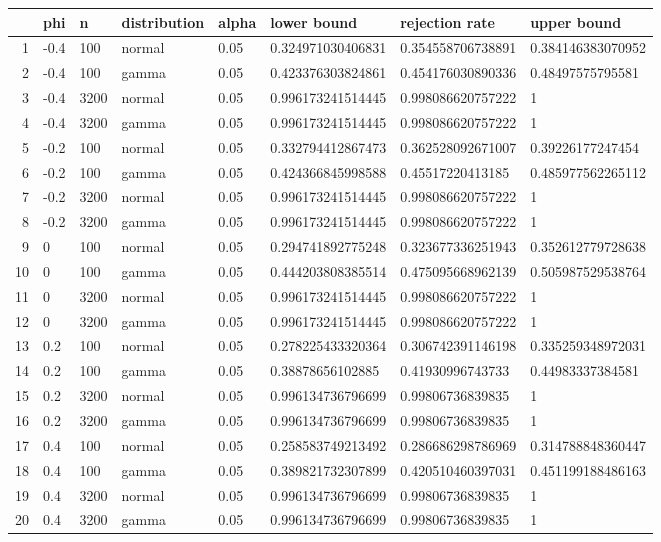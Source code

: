 \begin{table}[ht]
\centering
\begin{tabular}{rlllllll}
  \hline
 & phi & n & distribution & alpha & lower bound & rejection rate & upper bound \\ 
  \hline
1 & -0.4 & 100 & normal & 0.05 & 0.324971030406831 & 0.354558706738891 & 0.384146383070952 \\ 
  2 & -0.4 & 100 & gamma & 0.05 & 0.423376303824861 & 0.454176030890336 & 0.48497575795581 \\ 
  3 & -0.4 & 3200 & normal & 0.05 & 0.996173241514445 & 0.998086620757222 & 1 \\ 
  4 & -0.4 & 3200 & gamma & 0.05 & 0.996173241514445 & 0.998086620757222 & 1 \\ 
  5 & -0.2 & 100 & normal & 0.05 & 0.332794412867473 & 0.362528092671007 & 0.39226177247454 \\ 
  6 & -0.2 & 100 & gamma & 0.05 & 0.424366845998588 & 0.45517220413185 & 0.485977562265112 \\ 
  7 & -0.2 & 3200 & normal & 0.05 & 0.996173241514445 & 0.998086620757222 & 1 \\ 
  8 & -0.2 & 3200 & gamma & 0.05 & 0.996173241514445 & 0.998086620757222 & 1 \\ 
  9 & 0 & 100 & normal & 0.05 & 0.294741892775248 & 0.323677336251943 & 0.352612779728638 \\ 
  10 & 0 & 100 & gamma & 0.05 & 0.444203808385514 & 0.475095668962139 & 0.505987529538764 \\ 
  11 & 0 & 3200 & normal & 0.05 & 0.996173241514445 & 0.998086620757222 & 1 \\ 
  12 & 0 & 3200 & gamma & 0.05 & 0.996173241514445 & 0.998086620757222 & 1 \\ 
  13 & 0.2 & 100 & normal & 0.05 & 0.278225433320364 & 0.306742391146198 & 0.335259348972031 \\ 
  14 & 0.2 & 100 & gamma & 0.05 & 0.38878656102885 & 0.41930996743733 & 0.44983337384581 \\ 
  15 & 0.2 & 3200 & normal & 0.05 & 0.996134736796699 & 0.99806736839835 & 1 \\ 
  16 & 0.2 & 3200 & gamma & 0.05 & 0.996134736796699 & 0.99806736839835 & 1 \\ 
  17 & 0.4 & 100 & normal & 0.05 & 0.258583749213492 & 0.286686298786969 & 0.314788848360447 \\ 
  18 & 0.4 & 100 & gamma & 0.05 & 0.389821732307899 & 0.420510460397031 & 0.451199188486163 \\ 
  19 & 0.4 & 3200 & normal & 0.05 & 0.996134736796699 & 0.99806736839835 & 1 \\ 
  20 & 0.4 & 3200 & gamma & 0.05 & 0.996134736796699 & 0.99806736839835 & 1 \\ 
   \hline
\end{tabular}
\end{table}

